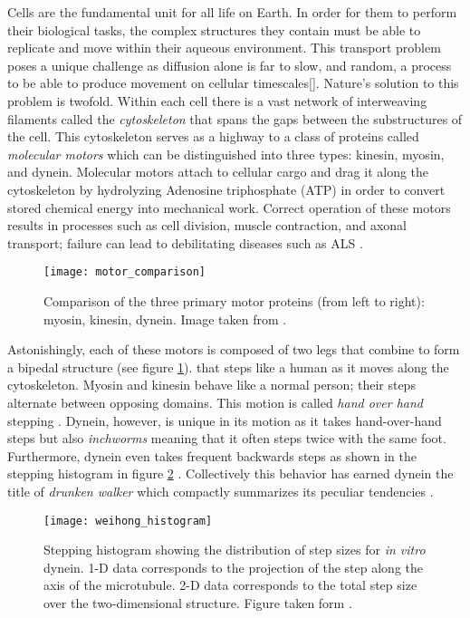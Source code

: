 Cells are the fundamental unit for all life on Earth. In order
for them to perform their biological tasks, the complex structures they contain
must be able to replicate and move within their aqueous environment. This
transport problem  poses a unique challenge as diffusion alone is far to slow,
and random, a process to be able to produce movement on cellular timescales[].
Nature's solution to this problem is twofold. Within each cell there is a vast network of interweaving filaments called the \textit{cytoskeleton} that spans the gaps between the substructures of the cell. This cytoskeleton serves as a highway to a class of proteins called \textit{molecular motors} which can be distinguished into three types: kinesin, myosin, and dynein. Molecular motors attach to cellular cargo and drag it along the cytoskeleton by hydrolyzing Adenosine triphosphate (ATP) in order to convert stored chemical energy into mechanical work\cite{alberts_molecular_2002}. Correct operation of these motors results in processes such as cell division, muscle contraction, and axonal transport; failure can lead to debilitating diseases such as ALS \cite{boillee_als:_2006}. 

\begin{figure}[!hbt]
	\centering 
	\texttt{[image: motor\_comparison]}
	\caption{Comparison of the three primary motor proteins (from left to right): myosin, kinesin, dynein. Image taken from \cite{philips__nodate}.}
	\label{fig:motor proteins} 
\end{figure}

Astonishingly, each of these motors is composed of two legs that combine to form a bipedal structure (see figure \ref{fig:motor proteins}). that steps like a human as it moves along the cytoskeleton. Myosin and kinesin behave like a normal person; their steps alternate between opposing domains. This motion is called \textit{hand over hand} stepping \cite{noauthor_drunk_nodate}. Dynein, however, is unique in its motion as it takes hand-over-hand steps but also \textit{inchworms} meaning that it often steps twice with the same foot. Furthermore, dynein even takes frequent backwards steps as shown in the stepping histogram in figure \ref{fig:weihong histogram} \cite{qiu_dynein_2012}. Collectively this behavior has earned dynein the title of \textit{drunken walker} which compactly summarizes its peculiar tendencies \cite{noauthor_drunk_nodate}. \\

\begin{figure}[!hbt]
	\centering
	\texttt{[image: weihong\_histogram]}
	\caption{Stepping histogram showing the distribution of step sizes for \textit{in vitro} dynein. 1-D data corresponds to the projection of the step along the axis of the microtubule. 2-D data corresponds to the total step size over the two-dimensional structure. Figure taken form \cite{qiu_dynein_2012}.}  
	\label{fig:weihong histogram} 
\end{figure}

